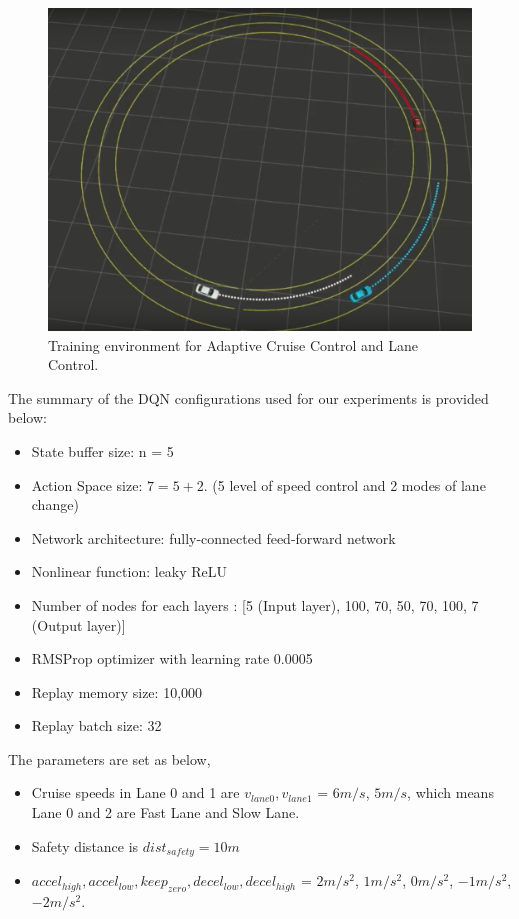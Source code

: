 \begin{figure}[h]
\centering
\includegraphics[width=1.0\textwidth]{figs/ch5/auto-env}
\caption{Training environment for Adaptive Cruise Control and Lane Control.}
\label{fig:auto-env}
\end{figure}

The summary of the DQN configurations used for our experiments is provided below:

\begin{itemize}
\item State buffer size: n = 5
\item Action Space size: $7 = 5 + 2$. (5 level of speed control and 2 modes of lane change)
\item Network architecture: fully-connected feed-forward network
\item Nonlinear function: leaky ReLU
\item Number of nodes for each layers : [5 (Input layer), 100, 70, 50, 70, 100, 7 (Output layer)]
\item RMSProp optimizer with learning rate 0.0005
\item Replay memory size: 10,000
\item Replay batch size: 32
\end{itemize}

The parameters are set as below,

\begin{itemize}
\item Cruise speeds in Lane 0 and 1 are $v_{lane0}, v_{lane1}$ = $6 m/s$, $5 m/s$, which means Lane 0 and 2 are Fast Lane and Slow Lane.
\item Safety distance is $dist_{safety} = 10 m$
\item $accel_{high}, accel_{low}, keep_{zero}, decel_{low}, decel_{high}$ = $2 m/s^2$, $1 m/s^2$, $0 m/s^2$, $-1 m/s^2$, $-2 m/s^2$.
\end{itemize}

